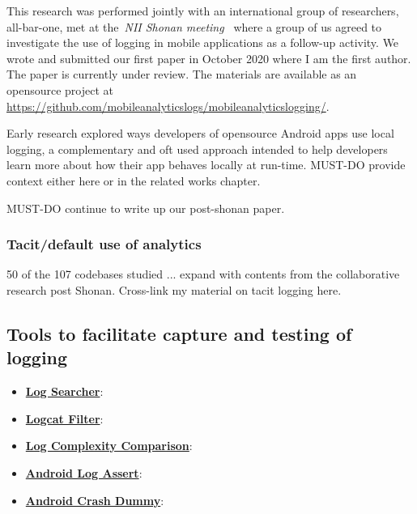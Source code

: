 This research was performed jointly with an international group of researchers, all-bar-one, met at the~\textit{NII Shonan meeting~\citep{nii_shonan_workshop_152}} where a group of us agreed to investigate the use of logging in mobile applications as a follow-up activity. We wrote and submitted our first paper in October 2020 where I am the first author. The paper is currently under review. The materials are available as an opensource project at \url{https://github.com/mobileanalyticslogs/mobileanalyticslogging/}.



Early research explored ways developers of opensource Android apps use local logging, a complementary and oft used approach intended to help developers learn more about how their app behaves locally at run-time. MUST-DO provide context either here or in the related works chapter.



MUST-DO continue to write up our post-shonan paper.



\subsubsection{Tacit/default use of analytics}
50 of the 107 codebases studied ... expand with contents from the collaborative research post Shonan. Cross-link my material on tacit logging here.

\subsection{Tools to facilitate capture and testing of logging}

\begin{itemize}
    \item \href{https://github.com/ISNIT0/log-searcher}{\textbf{Log Searcher}}:
    \item \href{https://github.com/ISNIT0/logcat-filter}{\textbf{Logcat Filter}}:
    \item \href{https://github.com/ISNIT0/log-complexity-comparison}{\textbf{Log Complexity Comparison}}:
    \item \href{https://github.com/ISNIT0/AndroidLogAssert}{\textbf{Android Log Assert}}:
    \item \href{https://github.com/ISNIT0/AndroidCrashDummy}{\textbf{Android Crash Dummy}}:
\end{itemize}



